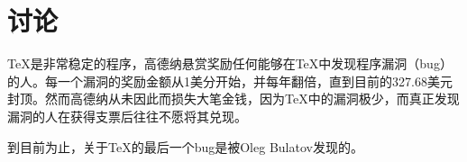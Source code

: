 
\chapter{讨论}

\TeX 是非常稳定的程序，高德纳悬赏奖励任何能够在\TeX 中发现程序漏洞（bug）的人。每一个漏洞的奖励金额从1美分开始，并每年翻倍，直到目前的327.68美元封顶。然而高德纳从未因此而损失大笔金钱，因为\TeX 中的漏洞极少，而真正发现漏洞的人在获得支票后往往不愿将其兑现。

到目前为止，关于\TeX 的最后一个bug是被Oleg Bulatov发现的。